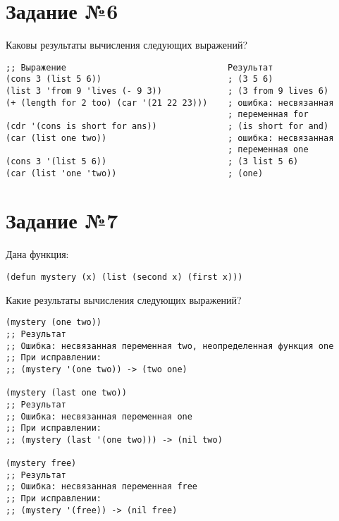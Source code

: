 \section{Задание №6}

Каковы результаты вычисления следующих выражений?

\vspace{4mm}
\begin{minipage}{0.92\linewidth}
\begin{lstlisting}
;; Выражение                                Результат
(cons 3 (list 5 6))                         ; (3 5 6)
(list 3 'from 9 'lives (- 9 3))             ; (3 from 9 lives 6)
(+ (length for 2 too) (car '(21 22 23)))    ; ошибка: несвязанная
                                            ; переменная for
(cdr '(cons is short for ans))              ; (is short for and)
(car (list one two))                        ; ошибка: несвязанная
                                            ; переменная one
(cons 3 '(list 5 6))                        ; (3 list 5 6)
(car (list 'one 'two))                      ; (one)
\end{lstlisting}
\end{minipage}

\section{Задание №7}

Дана функция:

\vspace{4mm}
\begin{minipage}{0.92\linewidth}
\begin{lstlisting}
(defun mystery (x) (list (second x) (first x)))
\end{lstlisting}
\end{minipage}

Какие результаты вычисления следующих выражений?

\vspace{4mm}
\begin{minipage}{0.92\linewidth}
\begin{lstlisting}
(mystery (one two))
;; Результат
;; Ошибка: несвязанная переменная two, неопределенная функция one
;; При исправлении:
;; (mystery '(one two)) -> (two one)

(mystery (last one two))
;; Результат
;; Ошибка: несвязанная переменная one
;; При исправлении:
;; (mystery (last '(one two))) -> (nil two)

(mystery free)
;; Результат
;; Ошибка: несвязанная переменная free
;; При исправлении:
;; (mystery '(free)) -> (nil free)
\end{lstlisting}
\end{minipage}

